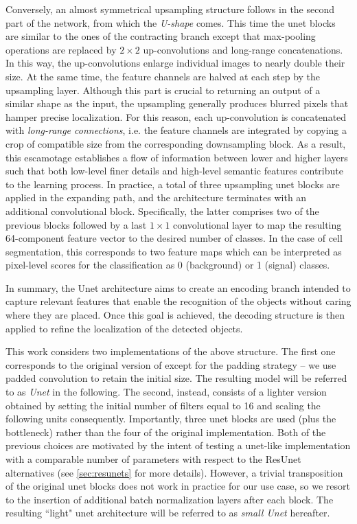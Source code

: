 Conversely, an almost symmetrical upsampling structure follows in the second part of the network, from which the \textit{U-shape} comes. This time the unet blocks are similar to the ones of the contracting branch except that max-pooling operations are replaced by $2\times2$ up-convolutions \cite{dumoulin2016guideconvolution, zeiler2010deconvolutional} and long-range concatenations.
In this way, the up-convolutions enlarge individual images to nearly double their size. At the same time, the feature channels are halved at each step by the upsampling layer. 
Although this part is crucial to returning an output of a similar shape as the input, the upsampling generally produces blurred pixels that hamper precise localization.
For this reason, each up-convolution is concatenated with \textit{long-range connections}, i.e. the feature channels are integrated by copying a crop of compatible size from the corresponding downsampling block.
As a result, this escamotage establishes a flow of information between lower and higher layers such that both low-level finer details and high-level semantic features contribute to the learning process.
In practice, a total of three upsampling unet blocks are applied in the expanding path, and the architecture terminates with an additional convolutional block.
Specifically, the latter comprises two of the previous  blocks followed by a last $1\times1$ convolutional layer to map the resulting 64-component feature vector to the desired number of classes. 
In the case of cell segmentation, this corresponds to two feature maps which can be interpreted as pixel-level scores for the classification as 0 (background) or 1 (signal) classes.

In summary, the Unet architecture aims to create an encoding branch intended to capture relevant features that enable the recognition of the objects without caring where they are placed. Once this goal is achieved, the decoding structure is then applied to refine the localization of the detected objects.

This work considers two implementations of the above structure. The first one corresponds to the original version of  except for the padding strategy -- we use padded convolution to retain the initial size.
The resulting model will be referred to as \textit{Unet} in the following.
The second, instead, consists of a lighter version obtained by setting the initial number of filters equal to 16 and scaling the following units consequently.
Importantly, three unet blocks are used (plus the bottleneck) rather than the four of the original implementation.
Both of the previous choices are motivated by the intent of testing a unet-like implementation with a comparable number of parameters with respect to the ResUnet alternatives (see \cref{sec:resunets} for more details).
However, a trivial transposition of the original unet blocks does not work in practice for our use case, so we resort to the insertion of additional batch normalization \cite[Section 8.7.1]{Goodfellow2016deeplearning} layers after each  block.
The resulting ``light" unet architecture will be referred to as \textit{small Unet} hereafter.


